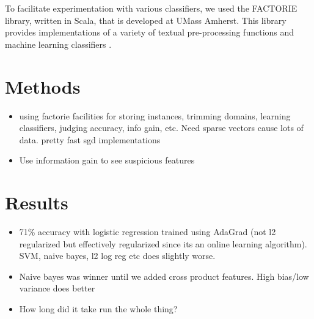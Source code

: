\documentclass[11pt]{article}
\begin{document}
To facilitate experimentation with various classifiers, we used the
FACTORIE library, written in Scala, that is developed at UMass
Amherst.  This library provides implementations of a variety of
textual pre-processing functions and machine learning classifiers
\cite{mccallum09:factorie:}.

\section{Methods}
\begin{itemize}
\item using factorie facilities for storing instances, trimming domains, learning classifiers, judging accuracy, info gain, etc. Need sparse vectors cause lots of data. pretty fast sgd implementations
\item Use information gain to see suspicious features
\end{itemize}

\section{Results}
\begin{itemize}
\item 71\% accuracy with logistic regression trained using AdaGrad (not l2 regularized but effectively regularized since its an online learning algorithm). SVM, naive bayes, l2 log reg etc does slightly worse.
\item Naive bayes was winner until we added cross product
  features. High bias/low variance does better
  \item How long did it take run the whole thing?
\end{itemize}
\end{document}
